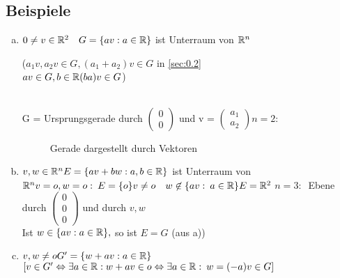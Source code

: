 \subsection{Beispiele}\label{sec:0.3}
\begin{enumerate}[a)]
\item $0 \ne v \in \mathbb{R}^2\quad G = \{ av: a \in \mathbb{R} \}$ ist Unterraum von $\mathbb{R}^n$\begin{minipage}{.3\textwidth}
($a_1v,a_2v \in G, (a_1 + a_2)v \in G$ in \ref{sec:0.2}\\
$av \in G, b \in \mathbb{R} (ba)v \in G$)
\end{minipage}\\
G = Ursprungsgerade durch $\begin{pmatrix}
0\\0
\end{pmatrix}$ und v = $\begin{pmatrix}
a_1\\a_2
\end{pmatrix}
n = 2$:
\begin{figure}[h!]
\centering
\caption{Gerade dargestellt durch Vektoren}
\end{figure}
\item $v,w \in \mathbb{R}^n\\
E = \{ av + bw : a,b \in \mathbb{R} \}$ ist Unterraum von $\mathbb{R}^n\\
v = o, w = o :\: E = \{ o \}\\
v \ne o\quad w \not\in \{ av:\: a \in \mathbb{R} \}\\
E = \mathbb{R}^2 $
$n = 3:\:$ Ebene durch $\begin{pmatrix}
0\\0\\0
\end{pmatrix}$ und durch $v,w$\\
Ist $w \in \{ av : a \in \mathbb{R} \},$ so ist $E = G$ (aus a))
\item $v,w \ne o\\
G' = \{ w + av : a \in \mathbb{R}\}$\\
$[v \in G' \Leftrightarrow \exists a \in \mathbb{R}: w+ av \in o \Leftrightarrow \exists a \in \mathbb{R} :\: w = (-a)v \in G]$
\end{enumerate}
